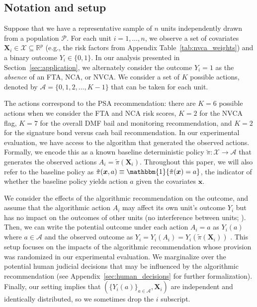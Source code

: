 \documentclass[12pt]{article}
\theoremstyle{definition}
\newcommand{\R}{\ensuremath{\mathbb{R}}}
\newcommand{\bbone}{\ensuremath{\mathbbm{1}}}
\newcommand{\bX}{\bm X}
\newcommand{\bx}{\bm x}
\newcommand{\<}{\langle}
\renewcommand{\>}{\rangle}
\newcommand\mcal[1]{\ensuremath{\mathcal{#1}}}
\begin{document}
\subsection{Notation and setup}

Suppose that we have a representative sample of $n$ units
independently drawn from a population $\mathcal{P}$.  For each unit
$i=1,\ldots,n$, we observe a set of covariates
$\bX_i \in \mcal{X} \subseteq \R^p$ (e.g., the risk factors from
Appendix Table~\ref{tab:nvca_weights}) and a binary outcome $Y_i \in \{0,1\}$.
In our analysis presented in Section~\ref{sec:application}, we
alternately consider the outcome $Y_i = 1$ as the \emph{absence} of an
FTA, NCA, or NVCA.
We consider a set of $K$ possible actions, denoted by
$\mathcal{A} = \{0,1,2,\ldots,K-1\}$ that can be taken for each unit.

The actions correspond to the PSA recommendation: there are
$K=6$ possible actions when we consider the FTA and NCA risk scores,
$K = 2$ for the NVCA flag, $K = 7$ for the overall DMF bail and
monitoring recommendation, and $K=2$ for the signature bond versus
cash bail recommendation.  In our experimental evaluation, we have
access to the algorithm that generated the observed actions.
Formally, we encode this as a known baseline deterministic policy
$\tilde{\pi} : \mcal{X} \to \mathcal{A}$ that generates the observed
actions $A_i = \tilde{\pi}(\bX_i)$.  Throughout this paper, we will
also refer to the baseline policy as
$\tilde{\pi}(\bx, a) \equiv \bbone\{\tilde{\pi}(\bx) = a\}$, the
indicator of whether the baseline policy yields action $a$ given the
covariates $\bx$.

We consider the effects of the algorithmic recommendation on the
outcome, and assume that the algorithmic action $A_i$ may affect its
own unit's outcome $Y_i$ but has no impact on the outcomes of other units
(no interference between units; \cite{rubin1980}).  Then, we can
write the potential outcome under each action $A_i = a$ as $Y_i(a)$
where $a \in \mathcal{A}$ and the observed outcome as
$Y_i = Y_i(A_i) = Y_i(\tilde{\pi}(\bX_i))$ \citep{neyman1923}.  This
setup focuses on the impacts of the algorithmic recommendation whose
provision was randomized in our experimental evaluation.  We
marginalize over the potential human judicial decisions that may be
influenced by the algorithmic recommendation (see
Appendix~\ref{sec:human_decisions} for further formalization).
Finally, our setting implies that
$(\{Y_i(a)\}_{a \in \mathcal{A}}, \bX_i)$ are independent and
identically distributed, so we sometimes drop the $i$ subscript.
\end{document}
